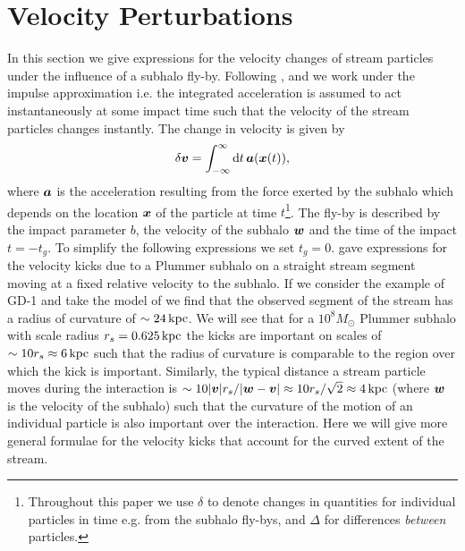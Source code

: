 \documentclass[useAMS,usenatbib,fleqn,a4paper]{mn2e}
\def\d{{\rm d}}
\def\kpc{\,{\rm kpc}}
\newcommand{\bs}[1]{\bmath{#1}}
\begin{document}
\section{Velocity Perturbations}\label{Sect::Formalism}
In this section we give expressions for the velocity changes of stream particles under the influence of a subhalo fly-by. Following \cite{YoonJohnstonHogg}, \cite{Carlberg2013} and \cite{ErkalBelokurov2015} we work under the impulse approximation i.e. the integrated acceleration is assumed to act instantaneously at some impact time such that the velocity of the stream particles changes instantly. The change in velocity is given by
\begin{equation}
\delta\bs{v} = \int_{-\infty}^{\infty} \d t\,\bs{a}(\bs{x}(t)),
\end{equation}
where $\bs{a}$ is the acceleration resulting from the force exerted by the subhalo which depends on the location $\bs{x}$ of the particle at time $t$\footnote{Throughout this paper we use $\delta$ to denote changes in quantities for individual particles in time e.g. from the subhalo fly-bys, and $\Delta$ for differences \emph{between} particles.}. The fly-by is described by the impact parameter $b$, the velocity of the subhalo $\bs{w}$ and the time of the impact $t=-t_g$. To simplify the following expressions we set $t_g=0$. \cite{ErkalBelokurov2015} gave expressions for the velocity kicks due to a Plummer subhalo on a straight stream segment moving at a fixed relative velocity to the subhalo. If we consider the example of GD-1 and take the model of \cite{Koposov2010} we find that the observed segment of the stream has a radius of curvature of $\sim24\kpc$. We will see that for a $10^8M_\odot$ Plummer subhalo with scale radius $r_s=0.625\kpc$ the kicks are important on scales of $\sim10r_s\approx6\kpc$ such that the radius of curvature is comparable to the region over which the kick is important. Similarly, the typical distance a stream particle moves during the interaction is $\sim10|\bs{v}|r_s/|\bs{w}-\bs{v}|\approx10r_s/\sqrt{2}\approx4\kpc$ (where $\bs{w}$ is the velocity of the subhalo) such that the curvature of the motion of an individual particle is also important over the interaction. Here we will give more general formulae for the velocity kicks that account for the curved extent of the stream.
\end{document}
